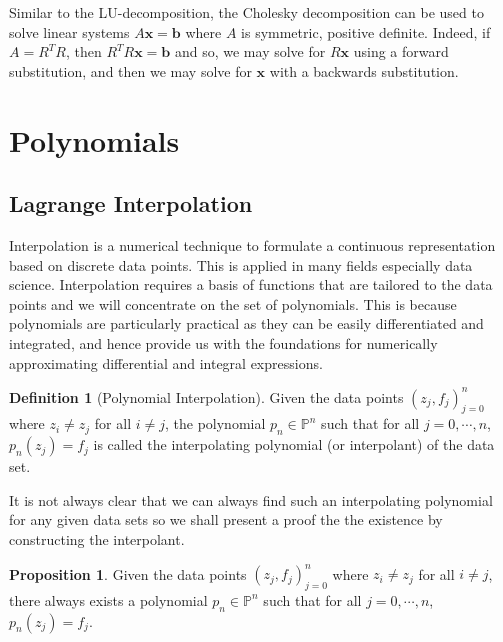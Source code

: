\documentclass[
]{article}
\theoremstyle{definition}
\newtheorem{prop}{Proposition}
\theoremstyle{definition}
\newtheorem{definition}{Definition}[section]
\begin{document}
Similar to the LU-decomposition, the Cholesky decomposition can be used
to solve linear systems \(A\mathbf{x} = \mathbf{b}\) where \(A\) is
symmetric, positive definite. Indeed, if \(A = R^T R\), then
\(R^T R \mathbf{x} = \mathbf{b}\) and so, we may solve for
\(R \mathbf{x}\) using a forward substitution, and then we may solve for
\(\mathbf{x}\) with a backwards substitution.

\newpage

\hypertarget{polynomials}{%
\section{Polynomials}\label{polynomials}}

\hypertarget{lagrange-interpolation}{%
\subsection{Lagrange Interpolation}\label{lagrange-interpolation}}

Interpolation is a numerical technique to formulate a continuous
representation based on discrete data points. This is applied in many
fields especially data science. Interpolation requires a basis of
functions that are tailored to the data points and we will concentrate
on the set of polynomials. This is because polynomials are particularly
practical as they can be easily differentiated and integrated, and hence
provide us with the foundations for numerically approximating
differential and integral expressions.

\begin{definition}[Polynomial Interpolation]
  Given the data points \((z_j, f_j)_{j = 0}^n\) where \(z_i \neq z_j\) for all 
  \(i \neq j\), the polynomial \(p_n \in \mathbb{P}^n\) such that for all \(j = 0, \cdots, n\), 
  \(p_n(z_j) = f_j\) is called the interpolating polynomial (or interpolant) 
  of the data set.
\end{definition}

It is not always clear that we can always find such an interpolating
polynomial for any given data sets so we shall present a proof the the
existence by constructing the interpolant.

\begin{prop}
  Given the data points \((z_j, f_j)_{j = 0}^n\) where \(z_i \neq z_j\) for all 
  \(i \neq j\), there always exists a polynomial \(p_n \in \mathbb{P}^n\) such 
  that for all \(j = 0, \cdots, n\), \(p_n(z_j) = f_j\).
\end{prop}
\proof
\end{document}
